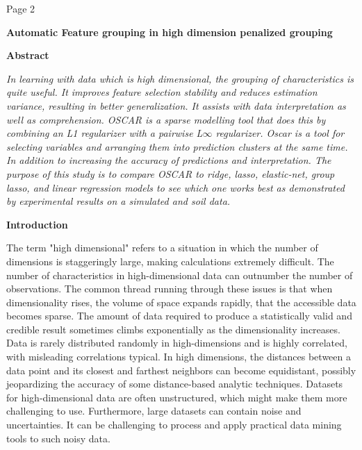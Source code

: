 \documentclass{article} %
\begin{document}


\noindent Page {\textbar} 2

\noindent 

\noindent \textbf{Automatic Feature grouping in high dimension penalized grouping}

\noindent \textbf{}

\noindent \textbf{Abstract}

\noindent \textit{In learning with data which is high dimensional, the grouping of characteristics is quite useful. It improves feature selection stability and reduces estimation variance, resulting in better generalization. It assists with data interpretation as well as comprehension. OSCAR is a sparse modelling tool that does this by combining an L1 regularizer with a pairwise L$\infty$ regularizer. Oscar is a tool for selecting variables and arranging them into prediction clusters at the same time. In addition to increasing the accuracy of predictions and interpretation. The purpose of this study is to compare OSCAR to ridge, lasso, elastic-net, group lasso, and linear regression models to see which one works best as demonstrated by experimental results on a simulated and soil data.}

\noindent 

\noindent \textbf{Introduction}

\noindent The term "high dimensional" refers to a situation in which the number of dimensions is staggeringly large, making calculations extremely difficult. The number of characteristics in high-dimensional data can outnumber the number of observations. The common thread running through these issues is that when dimensionality rises, the volume of space expands rapidly, that the accessible data becomes sparse. The amount of data required to produce a statistically valid and credible result sometimes climbs exponentially as the dimensionality increases. Data is rarely distributed randomly in high-dimensions and is highly correlated, with misleading correlations typical. In high dimensions, the distances between a data point and its closest and farthest neighbors can become equidistant, possibly jeopardizing the accuracy of some distance-based analytic techniques. Datasets for high-dimensional data are often unstructured, which might make them more challenging to use. Furthermore, large datasets can contain noise and uncertainties. It can be challenging to process and apply practical data mining tools to such noisy data.
\end{document}
